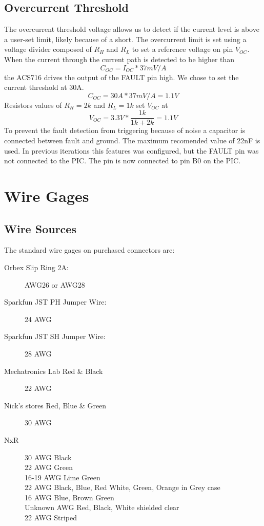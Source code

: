 \documentclass{article}
\begin{document}
\subsection{Overcurrent Threshold}
The overcurrent threshold voltage allows us to detect if the current level is above a user-set limit, likely because of a short. The overcurrent limit is set using a voltage divider composed of $R_H$ and $R_L$ to set a reference voltage on pin $V_{OC}$. When the current through the current path is detected to be higher than 
\[C_{OC} = I_{OC}*37mV/A\] 
the ACS716 drives the output of the FAULT pin high. We chose to set the current threshold at 30A. 
\[C_{OC} = 30A*37mV/A=1.1V\] 
Resistors values of $R_H=2k$ and $R_L=1k$ set $V_{OC}$ at 
\[V_{OC} = 3.3V*\frac{1k}{1k+2k}=1.1V\]
To prevent the fault detection from triggering because of noise a capacitor is connected between fault and ground. The maximum recomended value of 22nF is used.
In previous iterations this features was configured, but the FAULT pin was not connected to the PIC. The pin is now connected to pin B0 on the PIC.

\section{Wire Gages}
\subsection{Wire Sources}
The standard wire gages on purchased connectors are:
\begin{description}
\item[Orbex Slip Ring 2A:]
AWG26 or AWG28
\item[Sparkfun JST PH Jumper Wire:]
24 AWG
\item[Sparkfun JST SH Jumper Wire:]
28 AWG
\item[Mechatronics Lab Red \& Black]
22 AWG
\item[Nick's stores Red, Blue \& Green]
30 AWG
\item[NxR]
30 AWG Black\\
22 AWG Green\\
16-19 AWG Lime Green\\
22 AWG Black, Blue, Red White, Green, Orange in Grey case\\
16 AWG Blue, Brown Green\\
Unknown AWG Red, Black, White shielded clear\\
22 AWG Striped
\end{description}
\end{document}
